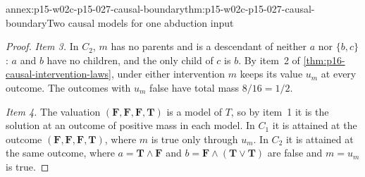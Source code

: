 \begin{annexitem}{annex:p15-w02c-p15-027-causal-boundary}{thm:p15-w02c-p15-027-causal-boundary}{Two causal models for one abduction input}
\begin{proof}
\emph{Item 3.} In \(C_2\), \(m\) has no parents and is a descendant of
neither \(a\) nor \(\{b,c\}\): \(a\) and \(b\) have no children, and the
only child of \(c\) is \(b\). By item~2 of
\cref{thm:p16-causal-intervention-laws}, under either intervention \(m\)
keeps its value \(u_m\) at every outcome. The outcomes with \(u_m\) false
have total mass \(8/16=1/2\).

\emph{Item 4.} The valuation \((\mathbf F,\mathbf F,\mathbf F,\mathbf T)\)
is a model of \(T\), so by item~1 it is the solution at an outcome of
positive mass in each model. In \(C_1\) it is attained at the outcome
\((\mathbf F,\mathbf F,\mathbf F,\mathbf T)\), where \(m\) is true only
through \(u_m\). In \(C_2\) it is attained at the same outcome, where
\(a=\mathbf T\land\mathbf F\) and \(b=\mathbf F\land(\mathbf T\lor\mathbf T)\)
are false and \(m=u_m\) is true.
\end{proof}
\end{annexitem}

